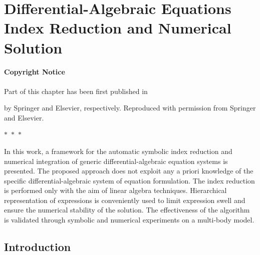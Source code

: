 
\chapter{Differential-Algebraic Equations Index Reduction and Numerical Solution}
\label{chap6:daes}

\subsubsection*{Copyright Notice}
Part of this chapter has been first published in
%
\begin{center}
  \begin{minipage}{0.9\textwidth}
  \end{minipage}
\end{center}
\begin{center}
  \begin{minipage}{0.9\textwidth}
  \end{minipage}
\end{center}
%
by Springer and Elsevier, respectively. Reproduced with permission from Springer and Elsevier.

\begin{center}
  $\ast$~$\ast$~$\ast$
\end{center}

In this work, a framework for the automatic symbolic index reduction and numerical integration of generic differential-algebraic equation systems is presented. The proposed approach does not exploit any a priori knowledge of the specific differential-algebraic system of equation formulation. The index reduction is performed only with the aim of linear algebra techniques. Hierarchical representation of expressions is conveniently used to limit expression swell and ensure the numerical stability of the solution. The effectiveness of the algorithm is validated through symbolic and numerical experiments on a multi-body model.


\section{Introduction}
\label{chap6:sec:introduction}

